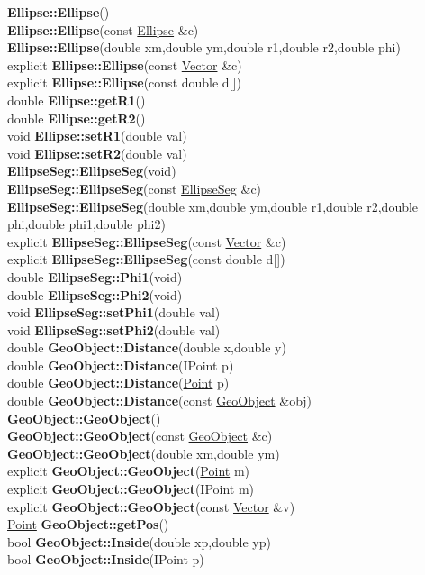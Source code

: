 \documentclass[10pt,titlepage]{article}
\def\functionlistentry#1#2#3#4#5#6{\noindent #1 {\bf #2}(#3) \dotfill #6\\}
\begin{document}
{{\functionlistentry{}{Ellipse::Ellipse}{}{532}{geoObject}{}
\functionlistentry{}{Ellipse::Ellipse}{const \hyperlink{Ellipse}{Ellipse} \&c}{533}{geoObject}{}
\functionlistentry{}{Ellipse::Ellipse}{double xm,double ym,double r1,double r2,double phi}{534}{geoObject}{}
\functionlistentry{explicit}{Ellipse::Ellipse}{const \hyperlink{Vector}{Vector} \&c}{535}{geoObject}{}
\functionlistentry{explicit}{Ellipse::Ellipse}{const double d[]}{536}{geoObject}{}
\functionlistentry{double}{Ellipse::getR1}{}{537}{geoObject}{}
\functionlistentry{double}{Ellipse::getR2}{}{539}{geoObject}{}
\functionlistentry{void}{Ellipse::setR1}{double val}{538}{geoObject}{}
\functionlistentry{void}{Ellipse::setR2}{double val}{540}{geoObject}{}
\functionlistentry{}{EllipseSeg::EllipseSeg}{void}{541}{geoObject}{}
\functionlistentry{}{EllipseSeg::EllipseSeg}{const \hyperlink{EllipseSeg}{EllipseSeg} \&c}{542}{geoObject}{}
\functionlistentry{}{EllipseSeg::EllipseSeg}{double xm,double ym,double r1,double r2,double phi,double phi1,double phi2}{543}{geoObject}{}
\functionlistentry{explicit}{EllipseSeg::EllipseSeg}{const \hyperlink{Vector}{Vector} \&c}{544}{geoObject}{}
\functionlistentry{explicit}{EllipseSeg::EllipseSeg}{const double d[]}{545}{geoObject}{}
\functionlistentry{double}{EllipseSeg::Phi1}{void}{546}{geoObject}{}
\functionlistentry{double}{EllipseSeg::Phi2}{void}{548}{geoObject}{}
\functionlistentry{void}{EllipseSeg::setPhi1}{double val}{547}{geoObject}{}
\functionlistentry{void}{EllipseSeg::setPhi2}{double val}{549}{geoObject}{}
\functionlistentry{double}{GeoObject::Distance}{double x,double y}{507}{geoObject}{}
\functionlistentry{double}{GeoObject::Distance}{IPoint p}{508}{geoObject}{}
\functionlistentry{double}{GeoObject::Distance}{\hyperlink{Point}{Point} p}{509}{geoObject}{}
\functionlistentry{double}{GeoObject::Distance}{const \hyperlink{GeoObject}{GeoObject} \&obj}{510}{geoObject}{}
\functionlistentry{}{GeoObject::GeoObject}{}{497}{geoObject}{}
\functionlistentry{}{GeoObject::GeoObject}{const \hyperlink{GeoObject}{GeoObject} \&c}{498}{geoObject}{}
\functionlistentry{}{GeoObject::GeoObject}{double xm,double ym}{499}{geoObject}{}
\functionlistentry{explicit}{GeoObject::GeoObject}{\hyperlink{Point}{Point} m}{500}{geoObject}{}
\functionlistentry{explicit}{GeoObject::GeoObject}{IPoint m}{501}{geoObject}{}
\functionlistentry{explicit}{GeoObject::GeoObject}{const \hyperlink{Vector}{Vector} \&v}{502}{geoObject}{}
\functionlistentry{\hyperlink{Point}{Point}}{GeoObject::getPos}{}{503}{geoObject}{}
\functionlistentry{bool}{GeoObject::Inside}{double xp,double yp}{511}{geoObject}{}
\functionlistentry{bool}{GeoObject::Inside}{IPoint p}{512}{geoObject}{}
}}
\end{document}
